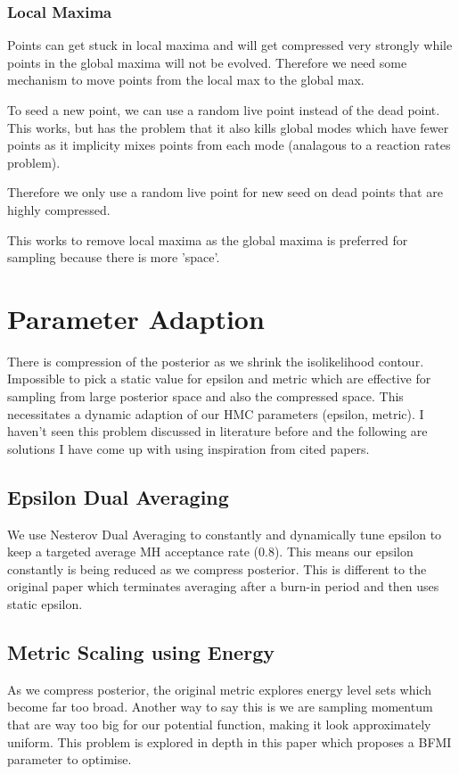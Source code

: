 \documentclass[11pt]{article}
\begin{document}
    \subsubsection{Local Maxima}
    Points can get stuck in local maxima and will get compressed very strongly while points in the global
    maxima will not be evolved. Therefore we need some mechanism to move points from the local max to the global max.

    To seed a new point, we can use a random live point instead of the dead point. This works, but has the problem that
    it also kills global modes which have fewer points as it implicity mixes
    points from each mode (analagous to a reaction rates problem).

    Therefore we only use a random live point for new seed on dead points that are highly compressed.

    This works to remove local maxima as the global maxima is preferred for sampling because there is more 'space'.

    \newpage
    \section{Parameter Adaption}
    There is compression of the posterior as we shrink the isolikelihood contour.
    Impossible to pick a static value for epsilon and metric which are effective for sampling
    from large posterior space and also the compressed space.
    This necessitates a dynamic adaption of our HMC parameters (epsilon, metric).
    I haven't seen this problem discussed in literature before and the following are solutions I have come up with
    using inspiration from cited papers.

    \subsection{Epsilon Dual Averaging}
    We use Nesterov Dual Averaging \cite{hoffman2011nouturn} to constantly and dynamically tune epsilon to keep a
    targeted average MH acceptance rate (0.8).
    This means our epsilon constantly is being reduced as we compress posterior.
    This is different to the original paper which terminates averaging after a burn-in period and then uses static epsilon.

    \subsection{Metric Scaling using Energy}
    As we compress posterior, the original metric explores energy level sets which become far too broad. Another way to
    say this is we are sampling momentum that are way too big for our potential function, making it look approximately uniform.
    This problem is explored in depth in this paper \cite{betancourt2016energymetric} which proposes a BFMI parameter to optimise.
\end{document}

